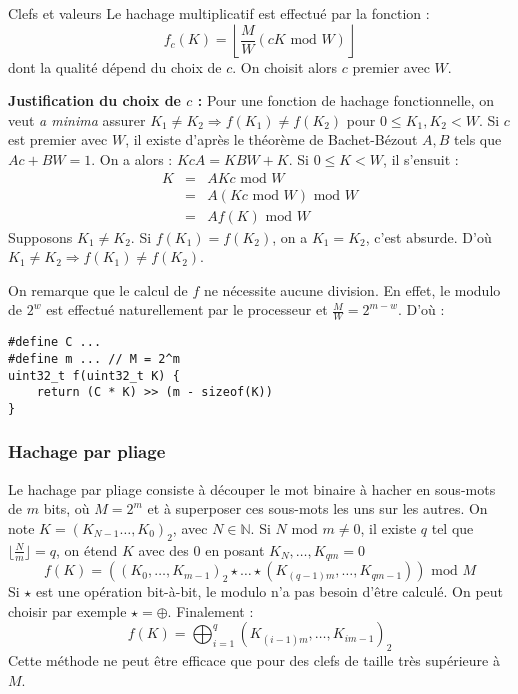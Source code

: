 \documentclass[../../../main.tex]{subfiles}
\begin{document}
\begin{definition}{Clefs et valeurs}
Le hachage multiplicatif est effectué par la fonction :
$$f_c(K) = \left\lfloor\dfrac{M}{W}(c K\text{ mod }W)\right\rfloor$$
dont la qualité dépend du choix de $c$. On choisit alors $c$ premier avec $W$.

\textbf{Justification du choix de $c$ :} Pour une fonction de hachage fonctionnelle, on veut \textit{a minima} assurer $K_1\neq K_2\Rightarrow f(K_1)\neq f(K_2)$ pour $0 \leq K_1, K_2 < W$. Si $c$ est premier avec $W$, il existe d'après le théorème de Bachet-Bézout $A, B$ tels que $Ac + BW = 1$. On a alors : $Kc A = KBW + K$.\newline
Si $0\leq K < W$, il s'ensuit :
$$\begin{array}{lcll}
K & = & AKc \text{ mod }W \\
  & = & A(Kc\text{ mod }W)\text{ mod }W \\
  & = & Af(K)\text{ mod } W\end{array}$$
Supposons $K_1\neq K_2$. Si $f(K_1) = f(K_2)$, on a $K_1 = K_2$, c'est absurde.\newline
D'où $K_1 \neq K_2 \Rightarrow f(K_1)\neq f(K_2)$.

On remarque que le calcul de $f$ ne nécessite aucune division. En effet, le modulo de $2^w$ est effectué naturellement par le processeur et $\frac{M}{W} = 2^{m-w}$. D'où :
\begin{verbatim}
#define C ...
#define m ... // M = 2^m
uint32_t f(uint32_t K) {
	return (C * K) >> (m - sizeof(K))
}
\end{verbatim}
\subsubsection{Hachage par pliage}
Le hachage par pliage consiste à découper le mot binaire à hacher en sous-mots de $m$ bits, où $M = 2^m$ et à superposer ces sous-mots les uns sur les autres. On note $K = (K_{N-1} \dots, K_0)_2$, avec $N\in\mathbb{N}$. Si $N\text{ mod }m \neq 0$, il existe $q$ tel que $\lfloor\frac{N}{m}\rfloor = q$, on étend $K$ avec des $0$ en posant $K_N, \dots, K_{qm} = 0$
$$f(K) = \left((K_0, \dots, K_{m-1})_2\star \dots \star (K_{(q-1)m}, \dots, K_{qm - 1})\right)\text{ mod }M$$
Si $\star$ est une opération bit-à-bit, le modulo n'a pas besoin d'être calculé. On peut choisir par exemple $\star = \oplus$. Finalement :
$$f(K) = \displaystyle\bigoplus_{i = 1}^{q}(K_{(i - 1)m}, \dots, K_{im - 1})_2$$
Cette méthode ne peut être efficace que pour des clefs de taille très supérieure à $M$.

\end{definition}
\end{document}
